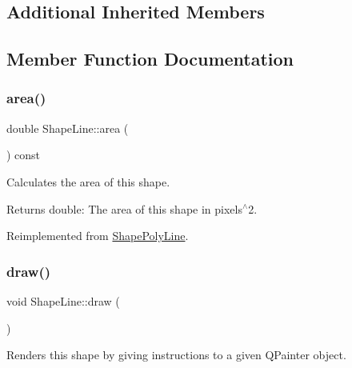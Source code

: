 \subsection*{Additional Inherited Members}


\subsection{Member Function Documentation}
\mbox{\label{class_shape_line_a6f33bdd78706ad73e570b4ba53bbc00b}} 
\subsubsection{\texorpdfstring{area()}{area()}}
{\footnotesize\ttfamily double Shape\+Line\+::area (\begin{DoxyParamCaption}{ }\end{DoxyParamCaption}) const\hspace{0.3cm}{\ttfamily [virtual]}}



Calculates the area of this shape. 

\begin{DoxyReturn}{Returns}
double\+: The area of this shape in pixels$^\wedge$2. 
\end{DoxyReturn}


Reimplemented from \mbox{\hyperlink{class_shape_poly_line_ace9d3c1eefec00364034dc420262c91e}{Shape\+Poly\+Line}}.

\mbox{\label{class_shape_line_a8b4dbfe05387934a0f9c4a053a798239}} 
\subsubsection{\texorpdfstring{draw()}{draw()}}
{\footnotesize\ttfamily void Shape\+Line\+::draw (\begin{DoxyParamCaption}\item[{Q\+Painter \&}]{ }\end{DoxyParamCaption})\hspace{0.3cm}{\ttfamily [virtual]}}



Renders this shape by giving instructions to a given Q\+Painter object. 


